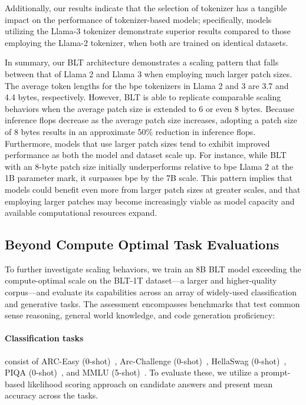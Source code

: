 Additionally, our results indicate that the selection of tokenizer has a tangible impact on the performance of tokenizer-based models; specifically, models utilizing the Llama-3 tokenizer demonstrate superior results compared to those employing the Llama-2 tokenizer, when both are trained on identical datasets.

In summary, our {\textsc BLT} architecture demonstrates a scaling pattern that falls between that of Llama 2 and Llama 3 when employing much larger patch sizes. The average token lengths for the bpe tokenizers in Llama 2 and 3 are 3.7 and 4.4 bytes, respectively. However, {\textsc BLT} is able to replicate comparable scaling behaviors when the average patch size is extended to 6 or even 8 bytes. Because inference flops decrease as the average patch size increases, adopting a patch size of 8 bytes results in an approximate 50\% reduction in inference flops. Furthermore, models that use larger patch sizes tend to exhibit improved performance as both the model and dataset scale up. For instance, while {\textsc BLT} with an 8-byte patch size initially underperforms relative to bpe Llama 2 at the 1B parameter mark, it surpasses bpe by the 7B scale. This pattern implies that models could benefit even more from larger patch sizes at greater scales, and that employing larger patches may become increasingly viable as model capacity and available computational resources expand.

\subsection{Beyond Compute Optimal Task Evaluations}
\label{section:evals}
To further investigate scaling behaviors, we train an 8B {\textsc BLT} model exceeding the compute-optimal scale on the {\textsc BLT}-1T dataset—a larger and higher-quality corpus—and evaluate its capabilities across an array of widely-used classification and generative tasks. The assessment encompasses benchmarks that test common sense reasoning, general world knowledge, and code generation proficiency:
\paragraph{Classification tasks} consist of ARC-Easy (0-shot)~\citep{Eval_ARC}, Arc-Challenge (0-shot)~\citep{Eval_ARC}, HellaSwag (0-shot)~\citep{Eval_hellaswag}, PIQA (0-shot)~\citep{Eval_piqa}, and MMLU (5-shot)~\citep{hendrycks2020measuring}. To evaluate these, we utilize a prompt-based likelihood scoring approach on candidate answers and present mean accuracy across the tasks.
